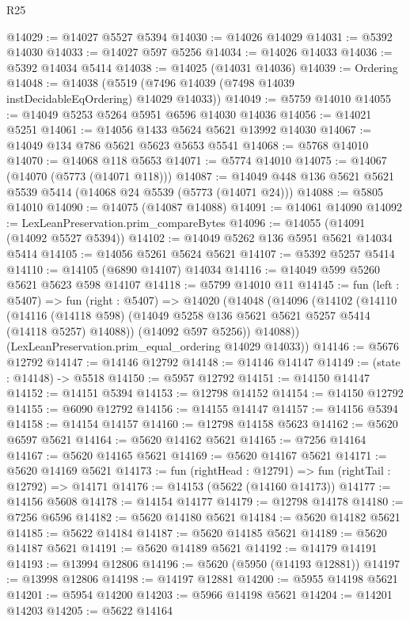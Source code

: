 \begin{lexlean}{R25}
\begin{coremodule}
@14029 := @14027 @5527 @5394
@14030 := @14026 @14029
@14031 := @5392 @14030
@14033 := @14027 @597 @5256
@14034 := @14026 @14033
@14036 := @5392 @14034 @5414
@14038 := @14025 (@14031 @14036)
@14039 := Ordering
@14048 := @14038 (@5519 (@7496 @14039 (@7498 @14039 instDecidableEqOrdering) @14029 @14033))
@14049 := @5759 @14010
@14055 := @14049 @5253 @5264 @5951 @6596 @14030 @14036
@14056 := @14021 @5251
@14061 := @14056 @1433 @5624 @5621 @13992 @14030
@14067 := @14049 @134 @786 @5621 @5623 @5653 @5541
@14068 := @5768 @14010
@14070 := @14068 @118 @5653
@14071 := @5774 @14010
@14075 := @14067 (@14070 (@5773 (@14071 @118)))
@14087 := @14049 @448 @136 @5621 @5621 @5539 @5414 (@14068 @24 @5539 (@5773 (@14071 @24)))
@14088 := @5805 @14010
@14090 := @14075 (@14087 @14088)
@14091 := @14061 @14090
@14092 := LexLeanPreservation.prim_compareBytes
@14096 := @14055 (@14091 (@14092 @5527 @5394))
@14102 := @14049 @5262 @136 @5951 @5621 @14034 @5414
@14105 := @14056 @5261 @5624 @5621
@14107 := @5392 @5257 @5414
@14110 := @14105 (@6890 @14107) @14034
@14116 := @14049 @599 @5260 @5621 @5623 @598 @14107
@14118 := @5799 @14010 @11
@14145 := fun (left : @5407) =>
  fun (right : @5407) =>
  @14020
    (@14048
      (@14096
        (@14102
          (@14110
            (@14116 (@14118 @598) (@14049 @5258 @136 @5621 @5621 @5257 @5414 (@14118 @5257) @14088))
            (@14092 @597 @5256))
          @14088))
      (LexLeanPreservation.prim_equal_ordering @14029 @14033))
@14146 := @5676 @12792
@14147 := @14146 @12792
@14148 := @14146 @14147
@14149 := (state : @14148) -> @5518
@14150 := @5957 @12792
@14151 := @14150 @14147
@14152 := @14151 @5394
@14153 := @12798 @14152
@14154 := @14150 @12792
@14155 := @6090 @12792
@14156 := @14155 @14147
@14157 := @14156 @5394
@14158 := @14154 @14157
@14160 := @12798 @14158 @5623
@14162 := @5620 @6597 @5621
@14164 := @5620 @14162 @5621
@14165 := @7256 @14164
@14167 := @5620 @14165 @5621
@14169 := @5620 @14167 @5621
@14171 := @5620 @14169 @5621
@14173 := fun (rightHead : @12791) => fun (rightTail : @12792) => @14171
@14176 := @14153 (@5622 (@14160 @14173))
@14177 := @14156 @5608
@14178 := @14154 @14177
@14179 := @12798 @14178
@14180 := @7256 @6596
@14182 := @5620 @14180 @5621
@14184 := @5620 @14182 @5621
@14185 := @5622 @14184
@14187 := @5620 @14185 @5621
@14189 := @5620 @14187 @5621
@14191 := @5620 @14189 @5621
@14192 := @14179 @14191
@14193 := @13994 @12806
@14196 := @5620 (@5950 (@14193 @12881))
@14197 := @13998 @12806
@14198 := @14197 @12881
@14200 := @5955 @14198 @5621
@14201 := @5954 @14200
@14203 := @5966 @14198 @5621
@14204 := @14201 @14203
@14205 := @5622 @14164

\end{coremodule}
\end{lexlean}
